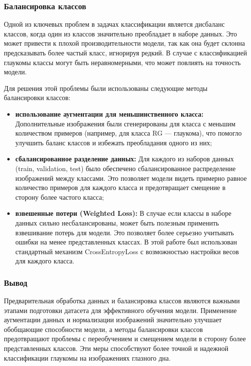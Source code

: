 {    \subsubsection*{Балансировка классов}
    
    Одной из ключевых проблем в задачах классификации является дисбаланс классов, когда один из классов значительно преобладает в наборе данных. Это может привести к плохой производительности модели, так как она будет склонна предсказывать более частый класс, игнорируя редкий. В случае с классификацией глаукомы классы могут быть неравномерными, что может повлиять на точность модели.
    
    Для решения этой проблемы были использованы следующие методы балансировки классов:
    
    \begin{itemize}
        \item \textbf{использование аугментации для меньшинственного класса:} Дополнительные изображения были сгенерированы для класса с меньшим количеством примеров (например, для класса RG — глаукома), что помогло улучшить баланс классов и избежать преобладания одного из них;
        
        \item \textbf{сбалансированное разделение данных:} Для каждого из наборов данных (train, validation, test) было обеспечено сбалансированное распределение изображений между классами. Это позволяет модели видеть примерно равное количество примеров для каждого класса и предотвращает смещение в сторону более частого класса;
        
        \item \textbf{взвешенные потери (Weighted Loss):} В случае если классы в наборе данных сильно несбалансированы, может быть полезным применить взвешивание потерь для модели. Это позволяет более серьезно учитывать ошибки на менее представленных классах. В этой работе был использован стандартный механизм CrossEntropyLoss с возможностью настройки весов для каждого класса.
    \end{itemize}
    
    \subsubsection*{Вывод}
    
    Предварительная обработка данных и балансировка классов являются важными этапами подготовки датасета для эффективного обучения модели. Применение аугментации данных и нормализации изображений значительно улучшает обобщающие способности модели, а методы балансировки классов предотвращают проблемы с переобучением и смещением модели в сторону более представленных классов. Эти меры способствуют более точной и надежной классификации глаукомы на изображениях глазного дна.
    

}
